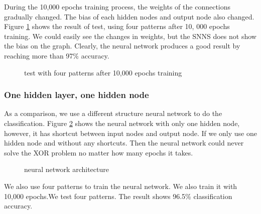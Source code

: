 \documentclass[11pt, a4paper, oneside, openright]{article}
\begin{document}
During the 10,000 epochs training process, the weights of the connections gradually changed. The bias of each hidden nodes and output node also changed. Figure \ref{fig:aftertrain} shows the result of test, using four patterns after 10, 000 epochs training. We could easily see the changes in weights, but the SNNS does not show the bias on the graph. Clearly, the neural network produces a good result by reaching more than 97\% accuracy.

  \begin{figure}[!ht]
  \centerline{}
  \caption{test with four patterns after 10,000 epochs training}
  \label{fig:aftertrain}
  \end{figure}

\subsubsection{One hidden layer, one hidden node}
As a comparison, we use a different structure neural network to do the classification. Figure \ref{fig:neural_2} shows the  neural network with only one hidden node, however, it has shortcut between input nodes and output node. If we only use one hidden node and without any shortcuts. Then the neural network could never solve the XOR problem no matter how many epochs it takes.
  \begin{figure}[!ht]
  \centerline{}
  \caption{neural network architecture}
  \label{fig:neural_2}
  \end{figure}
\newline We also use four patterns to train the neural network. We also train it with 10,000 epochs.We test four patterns. The result shows 96.5\% classification accuracy.
\end{document}

